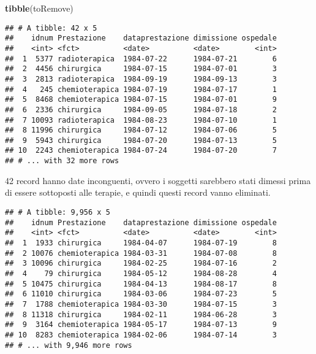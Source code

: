 \documentclass[]{article}
\newenvironment{Shaded}{\begin{snugshade}}{\end{snugshade}}
\newcommand{\KeywordTok}[1]{\textcolor[rgb]{0.13,0.29,0.53}{\textbf{#1}}}
\newcommand{\NormalTok}[1]{#1}
\newcommand{\OperatorTok}[1]{\textcolor[rgb]{0.81,0.36,0.00}{\textbf{#1}}}
\newcommand{\StringTok}[1]{\textcolor[rgb]{0.31,0.60,0.02}{#1}}
\begin{document}
\begin{Shaded}
\begin{Highlighting}[]
\KeywordTok{tibble}\NormalTok{(toRemove)}
\end{Highlighting}
\end{Shaded}

\begin{verbatim}
## # A tibble: 42 x 5
##    idnum Prestazione    dataprestazione dimissione ospedale
##    <int> <fct>          <date>          <date>        <int>
##  1  5377 radioterapica  1984-07-22      1984-07-21        6
##  2  4456 chirurgica     1984-07-15      1984-07-01        3
##  3  2813 radioterapica  1984-09-19      1984-09-13        3
##  4   245 chemioterapica 1984-07-19      1984-07-17        1
##  5  8468 chemioterapica 1984-07-15      1984-07-01        9
##  6  2336 chirurgica     1984-09-05      1984-07-18        2
##  7 10093 radioterapica  1984-08-23      1984-07-10        1
##  8 11996 chirurgica     1984-07-12      1984-07-06        5
##  9  5943 chirurgica     1984-07-20      1984-07-13        5
## 10  2243 chemioterapica 1984-07-24      1984-07-20        7
## # ... with 32 more rows
\end{verbatim}

42 record hanno date inconguenti, ovvero i soggetti sarebbero stati
dimessi prima di essere sottoposti alle terapie, e quindi questi record
vanno eliminati.

\begin{Shaded}
\end{Shaded}

\begin{verbatim}
## # A tibble: 9,956 x 5
##    idnum Prestazione    dataprestazione dimissione ospedale
##    <int> <fct>          <date>          <date>        <int>
##  1  1933 chirurgica     1984-04-07      1984-07-19        8
##  2 10076 chemioterapica 1984-03-31      1984-07-08        8
##  3 10096 chirurgica     1984-02-25      1984-07-16        2
##  4    79 chirurgica     1984-05-12      1984-08-28        4
##  5 10475 chirurgica     1984-04-13      1984-08-17        8
##  6 11010 chirurgica     1984-03-06      1984-07-23        5
##  7  1788 chemioterapica 1984-03-30      1984-07-15        3
##  8 11318 chirurgica     1984-02-11      1984-06-28        3
##  9  3164 chemioterapica 1984-05-17      1984-07-13        9
## 10  8283 chemioterapica 1984-02-06      1984-07-14        3
## # ... with 9,946 more rows
\end{verbatim}
\end{document}
